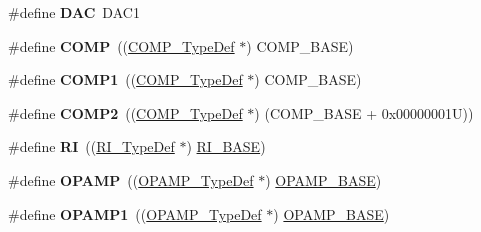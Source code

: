 \begin{DoxyCompactItemize}
\item 
\hypertarget{group___peripheral__declaration_ga4aa2a4ab86ce00c23035e5cee2e7fc7e}{\#define {\bfseries D\-A\-C}~D\-A\-C1}\label{group___peripheral__declaration_ga4aa2a4ab86ce00c23035e5cee2e7fc7e}

\item 
\hypertarget{group___peripheral__declaration_ga076912543697dbe4c46b79e8e44ad2fb}{\#define {\bfseries C\-O\-M\-P}~((\hyperlink{struct_c_o_m_p___type_def}{C\-O\-M\-P\-\_\-\-Type\-Def} $\ast$) C\-O\-M\-P\-\_\-\-B\-A\-S\-E)}\label{group___peripheral__declaration_ga076912543697dbe4c46b79e8e44ad2fb}

\item 
\hypertarget{group___peripheral__declaration_gaf5713f83009027d48805b049d55bb01b}{\#define {\bfseries C\-O\-M\-P1}~((\hyperlink{struct_c_o_m_p___type_def}{C\-O\-M\-P\-\_\-\-Type\-Def} $\ast$) C\-O\-M\-P\-\_\-\-B\-A\-S\-E)}\label{group___peripheral__declaration_gaf5713f83009027d48805b049d55bb01b}

\item 
\hypertarget{group___peripheral__declaration_ga6985fa7e9bb3c2edf15b29b7af210a2b}{\#define {\bfseries C\-O\-M\-P2}~((\hyperlink{struct_c_o_m_p___type_def}{C\-O\-M\-P\-\_\-\-Type\-Def} $\ast$) (C\-O\-M\-P\-\_\-\-B\-A\-S\-E + 0x00000001\-U))}\label{group___peripheral__declaration_ga6985fa7e9bb3c2edf15b29b7af210a2b}

\item 
\hypertarget{group___peripheral__declaration_ga7e71def3baefc10ec36f1dd48da4050e}{\#define {\bfseries R\-I}~((\hyperlink{struct_r_i___type_def}{R\-I\-\_\-\-Type\-Def} $\ast$) \hyperlink{group___peripheral__memory__map_ga8fdc749e6f184b3cd9b01f179af62e4c}{R\-I\-\_\-\-B\-A\-S\-E})}\label{group___peripheral__declaration_ga7e71def3baefc10ec36f1dd48da4050e}

\item 
\hypertarget{group___peripheral__declaration_gaaa993d5a85ac85c8abbd13e31d504bb6}{\#define {\bfseries O\-P\-A\-M\-P}~((\hyperlink{struct_o_p_a_m_p___type_def}{O\-P\-A\-M\-P\-\_\-\-Type\-Def} $\ast$) \hyperlink{group___peripheral__memory__map_ga6e9722d15c7ed794f0eca9682f64c03c}{O\-P\-A\-M\-P\-\_\-\-B\-A\-S\-E})}\label{group___peripheral__declaration_gaaa993d5a85ac85c8abbd13e31d504bb6}

\item 
\hypertarget{group___peripheral__declaration_gaf0025add8d004b4f4bf6eaeedd55c488}{\#define {\bfseries O\-P\-A\-M\-P1}~((\hyperlink{struct_o_p_a_m_p___type_def}{O\-P\-A\-M\-P\-\_\-\-Type\-Def} $\ast$) \hyperlink{group___peripheral__memory__map_ga6e9722d15c7ed794f0eca9682f64c03c}{O\-P\-A\-M\-P\-\_\-\-B\-A\-S\-E})}\label{group___peripheral__declaration_gaf0025add8d004b4f4bf6eaeedd55c488}


\end{DoxyCompactItemize}
